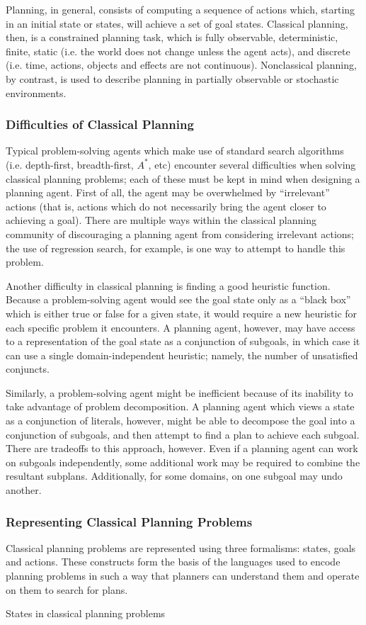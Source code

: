 Planning, in general, consists of computing a sequence of actions which, starting in an initial state or states, will achieve a set of goal states. Classical planning, then, is a constrained planning task, which is fully observable, deterministic, finite, static (i.e. the world does not change unless the agent acts), and discrete (i.e. time, actions, objects and effects are not continuous). Nonclassical planning, by contrast, is used to describe planning in partially observable or stochastic environments. 

\subsubsection{Difficulties of Classical Planning}

Typical problem-solving agents which make use of standard search algorithms (i.e. depth-first, breadth-first, $A^*$, etc) encounter several difficulties when solving classical planning problems; each of these must be kept in mind when designing a planning agent. First of all, the agent may be overwhelmed by ``irrelevant'' actions (that is, actions which do not necessarily bring the agent closer to achieving a goal). There are multiple ways within the classical planning community of discouraging a planning agent from considering irrelevant actions; the use of regression search, for example, is one way to attempt to handle this problem. 

Another difficulty in classical planning is finding a good heuristic function. Because a problem-solving agent would see the goal state only as a ``black box'' which is either true or false for a given state, it would require a new heuristic for each specific problem it encounters. A planning agent, however, may have access to a representation of the goal state as a conjunction of subgoals, in which case it can use a single domain-independent heuristic; namely, the number of unsatisfied conjuncts. 

Similarly, a problem-solving agent might be inefficient because of its inability to take advantage of problem decomposition. A planning agent which views a state as a conjunction of literals, however, might be able to decompose the goal into a conjunction of subgoals, and then attempt to find a plan to achieve each subgoal. There are tradeoffs to this approach, however. Even if a planning agent can work on subgoals independently, some additional work may be required to combine the resultant subplans. Additionally, for some domains, on one subgoal may undo another.

\subsubsection{Representing Classical Planning Problems}

Classical planning problems are represented using three formalisms: states, goals and actions. These constructs form the basis of the languages used to encode planning problems in such a way that planners can understand them and operate on them to search for plans. 

States in classical planning problems 